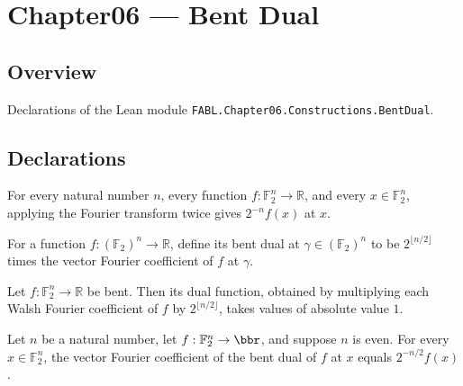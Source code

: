 \chapter{Chapter06 — Bent Dual}
\section{Overview}

Declarations of the Lean module \texttt{FABL.Chapter06.Constructions.BentDual}.

\section{Declarations}

\begin{theorem}
\label{FABL.vectorFourierCoeff_vectorFourierCoeff}
\leanok
{}
For every natural number $n$, every function $f:\mathbb{F}_2^n\to\mathbb{R}$, and every
$x\in\mathbb{F}_2^n$, applying the Fourier transform twice gives $2^{-n}f(x)$ at $x$.
\end{theorem}

\begin{definition}
\label{FABL.bentDual}
\leanok
{}
For a function $f:(\mathbb F_2)^n\to\mathbb R$, define its bent dual at
$\gamma\in(\mathbb F_2)^n$ to be $2^{\lfloor n/2\rfloor}$ times the vector Fourier
coefficient of $f$ at $\gamma$.
\end{definition}

\begin{theorem}
\label{FABL.IsBent.isSignValued_bentDual}
\leanok
{}
Let $f:\mathbb F_2^n\to\mathbb R$ be bent. Then its dual function, obtained by
multiplying each Walsh Fourier coefficient of $f$ by $2^{\lfloor n/2\rfloor}$, takes
values of absolute value $1$.
\end{theorem}

\begin{theorem}
\label{FABL.vectorFourierCoeff_bentDual}
\leanok
{}
Let $n$ be a natural number, let $f:\mathbb{F}_2^n\to\bbr$, and suppose $n$ is even. For
every $x\in\mathbb{F}_2^n$, the vector Fourier coefficient of the bent dual of $f$ at
$x$ equals $2^{-n/2}f(x)$.
\end{theorem}

